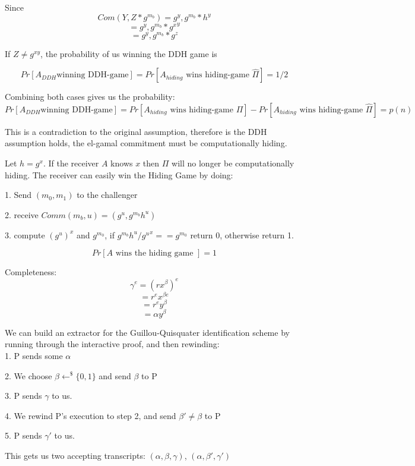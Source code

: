 \documentclass[12pt]{article}
\newenvironment{question}[2][Question]{\begin{trivlist}
		\item[\hskip \labelsep {\bfseries #1}\hskip \labelsep {\bfseries #2.}]}{\end{trivlist}}
\begin{document}
\begin{question}{3.1}
			Since $$Com(Y, Z*g^{m_b}) = g^y, g^{m_b}*h^y$$
			$$= g^y, g^{m_b}*{g^x}^y$$
			$$= g^y, g^{m_b}*g^z$$
			
			If $Z \neq g^{xy}$, the probability of us winning the DDH game is
			
			$$Pr[A_{DDH} \text{winning DDH-game}] = Pr[A_{hiding} \text{ wins hiding-game } \hat{\Pi}] = 1/2$$	
			
			Combining both cases gives us the probability:
			$$Pr[A_{DDH} \text{winning DDH-game}] = Pr[A_{hiding} \text{ wins hiding-game } \Pi] - Pr[A_{hiding} \text{ wins hiding-game } \hat{\Pi}] = p(n)$$
			
			This is a contradiction to the original assumption, therefore is the DDH assumption holds, the el-gamal commitment must be computationally hiding.
					

	\end{question}
	
	
			\begin{question}{3.2} 
				Let $h=g^x$. If the receiver $A$ knows $x$ then $\Pi$ will no longer be computationally hiding. The receiver can easily win the Hiding Game by doing:
				
				1. Send $(m_0, m_1)$ to the challenger
				
				2. receive $Comm(m_b, u) = (g^u, g^{m_b} h^u)$
				
				3. compute ${(g^u)}^x$ and $g^{m_0}$, if $g^{m_b} h^u/{g^u}^x == g^{m_0}$ return 0, otherwise return 1.
				
				$$Pr[A \text{ wins the hiding game } ] = 1$$
				
			\end{question}
		
			\begin{question}{4} 
				Completeness: 
				$$\gamma^e = (rx^\beta)^e$$
				$$=r^e x^{\beta e}$$
				$$=r^e y^\beta$$
				$$=\alpha y^\beta$$										
			\end{question}
		
	\begin{question}{4.1} 
		We can build an extractor for the Guillou-Quisquater identification scheme by running through the interactive proof, and then rewinding:\\
		
		1. P sends some $\alpha$
		
		2. We choose $\beta \leftarrow^\$ \{0,1\}$ and send $\beta$ to P
		
		3. P sends $\gamma$ to us.
		
		4. We rewind P's execution to step 2, and send $\beta' \neq \beta$ to P
		
		5. P sends $\gamma'$ to us.
		
		This gets us two accepting transcripts: $(\alpha, \beta, \gamma)$, $(\alpha, \beta', \gamma')$		 
		
	\end{question}	
\end{document}
